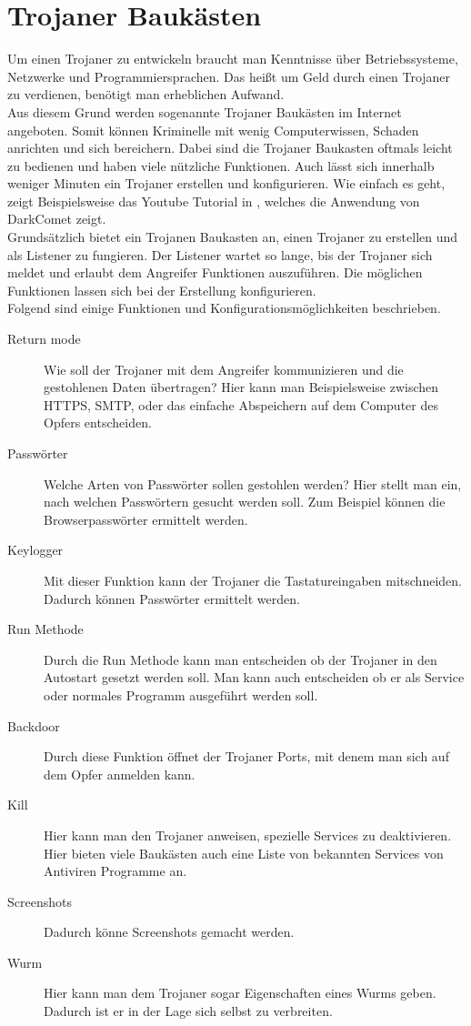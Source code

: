 \section{Trojaner Baukästen}\label{sec:trojanerBaukaesten}
Um einen Trojaner zu entwickeln braucht man Kenntnisse über Betriebssysteme, Netzwerke und Programmiersprachen.
Das heißt um Geld durch einen Trojaner zu verdienen, benötigt man erheblichen Aufwand.\\
Aus diesem Grund werden sogenannte Trojaner Baukästen im Internet angeboten. Somit können Kriminelle mit wenig Computerwissen, Schaden anrichten und sich bereichern. Dabei sind die Trojaner Baukasten oftmals leicht zu bedienen und haben viele nützliche Funktionen. Auch lässt sich innerhalb weniger Minuten ein Trojaner erstellen und konfigurieren. Wie einfach es geht, zeigt Beispielsweise das Youtube Tutorial in \cite{YOUTUBE}, welches die Anwendung von DarkComet zeigt.\\
Grundsätzlich bietet ein Trojanen Baukasten an, einen Trojaner zu erstellen und als Listener zu fungieren. Der Listener wartet so lange, bis der Trojaner sich meldet und erlaubt dem Angreifer Funktionen auszuführen. Die möglichen Funktionen lassen sich bei der Erstellung konfigurieren.\\
Folgend sind einige Funktionen und Konfigurationsmöglichkeiten beschrieben.\cite{PANDA}
\begin{description}
\item[Return mode] Wie soll der Trojaner mit dem Angreifer kommunizieren und die gestohlenen Daten übertragen? Hier kann man Beispielsweise zwischen HTTPS, SMTP, oder das einfache Abspeichern auf dem Computer des Opfers entscheiden.
\item[Passwörter] Welche Arten von Passwörter sollen gestohlen werden? Hier stellt man ein, nach welchen Passwörtern gesucht werden soll. Zum Beispiel können die Browserpasswörter ermittelt werden.
\item[Keylogger] Mit dieser Funktion kann der Trojaner die Tastatureingaben mitschneiden. Dadurch können Passwörter ermittelt werden.
\item[Run Methode] Durch die Run Methode kann man entscheiden ob der Trojaner in den Autostart gesetzt werden soll. Man kann auch entscheiden ob er als Service oder normales Programm ausgeführt werden soll.
\item[Backdoor] Durch diese Funktion öffnet der Trojaner Ports, mit denem man sich auf dem Opfer anmelden kann.
\item[Kill] Hier kann man den Trojaner anweisen, spezielle Services zu deaktivieren. Hier bieten viele Baukästen auch eine Liste von bekannten Services von Antiviren Programme an.
\item[Screenshots] Dadurch könne Screenshots gemacht werden.
\item[Wurm] Hier kann man dem Trojaner sogar Eigenschaften eines Wurms geben. Dadurch ist er in der Lage sich selbst zu verbreiten.
\end{description}
